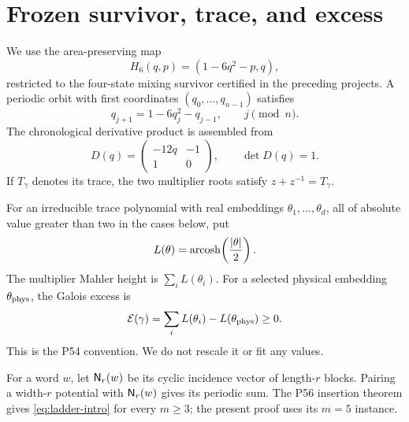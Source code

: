 \section{Frozen survivor, trace, and excess}

We use the area-preserving map
\begin{equation}\label{eq:H6}
 H_6(q,p)=(1-6q^2-p,q),
\end{equation}
restricted to the four-state mixing survivor certified in the preceding
projects.  A periodic orbit with first coordinates
\((q_0,\ldots,q_{n-1})\) satisfies
\begin{equation}\label{eq:recurrence}
 q_{j+1}=1-6q_j^2-q_{j-1},
 \qquad j\pmod n.
\end{equation}
The chronological derivative product is assembled from
\begin{equation}\label{eq:derivative}
 D(q)=\begin{pmatrix}-12q&-1\\1&0\end{pmatrix},
 \qquad \det D(q)=1.
\end{equation}
If \(T_\gamma\) denotes its trace, the two multiplier roots satisfy
\(z+z^{-1}=T_\gamma\).

For an irreducible trace polynomial with real embeddings
\(\theta_1,\ldots,\theta_d\), all of absolute value greater than two in the
cases below, put
\begin{equation}\label{eq:length}
 L(\theta)=\operatorname{arcosh}\!\left(\frac{|\theta|}{2}\right).
\end{equation}
The multiplier Mahler height is \(\sum_iL(\theta_i)\).  For a selected
physical embedding \(\theta_{\rm phys}\), the Galois excess is
\begin{equation}\label{eq:excess}
 \mathcal E(\gamma)=\sum_iL(\theta_i)-L(\theta_{\rm phys})\ge0.
\end{equation}
This is the P54 convention.  We do not rescale it or fit any values.

For a word \(w\), let \(\mathsf N_r(w)\) be its cyclic incidence vector of
length-\(r\) blocks.  Pairing a width-\(r\) potential with
\(\mathsf N_r(w)\) gives its periodic sum.  The P56 insertion theorem gives
\eqref{eq:ladder-intro} for every \(m\ge3\); the present proof uses its
\(m=5\) instance.
